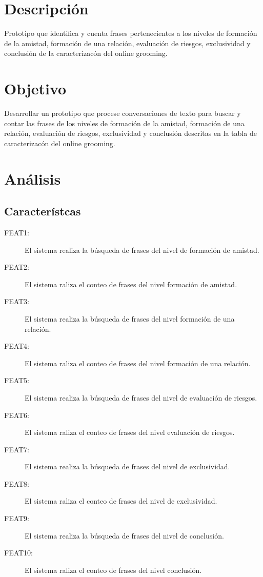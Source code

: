 \section{Descripci\'on}
Prototipo que identifica y cuenta frases pertenecientes a los niveles de  formaci\'on de la amistad, formaci\'on de una relaci\'on, evaluaci\'on de riesgos, exclusividad y conclusi\'on de la caracterizac\'on del online grooming.

\section{Objetivo}
Desarrollar un prototipo que procese conversaciones de texto para buscar y contar las frases de los niveles de formaci\'on de la amistad, formaci\'on de una relaci\'on, evaluaci\'on de riesgos, exclusividad y conclusi\'on descritas en la tabla de caracterizac\'on del online grooming.


\section{An\'alisis}
\subsection{Caracter\'istcas}

\begin{description}
\item[FEAT1:] El sistema realiza la b\'usqueda de frases del nivel de formaci\'on de amistad.
\item[FEAT2:] El sistema raliza el conteo de frases del nivel formaci\'on de amistad.
\item[FEAT3:] El sistema realiza la b\'usqueda de frases del nivel formaci\'on de una relaci\'on.
\item[FEAT4:] El sistema raliza el conteo de frases del nivel formaci\'on de una relaci\'on.
\item[FEAT5:] El sistema realiza la b\'usqueda de frases del nivel de evaluaci\'on de riesgos.
\item[FEAT6:] El sistema raliza el conteo de frases del nivel evaluaci\'on de riesgos.
\item[FEAT7:] El sistema realiza la b\'usqueda de frases del nivel de exclusividad.
\item[FEAT8:] El sistema raliza el conteo de frases del nivel de exclusividad.
\item[FEAT9:] El sistema realiza la b\'usqueda de frases del nivel de conclusi\'on.
\item[FEAT10:] El sistema raliza el conteo de frases del nivel conclusi\'on.
\end{description}

